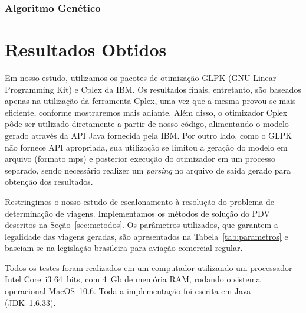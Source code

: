 \documentclass[12pt,a4paper]{article}
\newcommand{\zerar}{\setcounter{equation}{0}\setcounter{figure}{0}\setcounter{table}{0}}
\begin{document}

\subsubsection{Algoritmo Genético}
\label{sec:metodos_genetico}


\zerar
\section{Resultados Obtidos}
\label{sec:resultados}

Em nosso estudo, utilizamos os pacotes de otimização GLPK (GNU Linear Programming Kit) e Cplex da 
IBM. Os resultados finais, entretanto, são baseados apenas na utilização da ferramenta Cplex, uma 
vez que a mesma provou-se mais eficiente, conforme mostraremos mais adiante. Além disso, o 
otimizador Cplex pôde ser utilizado diretamente a partir de nosso código, alimentando o modelo 
gerado através da API Java fornecida pela IBM. Por outro lado, como o GLPK não fornece API 
apropriada, sua utilização se limitou a geração do modelo em arquivo (formato mps) e posterior 
execução do otimizador em um processo separado, sendo necessário realizer um {\it parsing} no 
arquivo de saída gerado para obtenção dos resultados.

Restringimos o nosso estudo de escalonamento à resolução do problema de determinação de viagens.
Implementamos os métodos de solução do PDV descritos na Seção~\ref{sec:metodos}. Os parâmetros 
utilizados, que garantem a legalidade das viagens geradas, são apresentados na 
Tabela~\ref{tab:parametros} e baseiam-se na legislação brasileira para aviação comercial regular. 

Todos os testes foram realizados em um computador utilizando um processador Intel Core~i3 64~bits, 
com 4~Gb de memória RAM, rodando o sistema operacional MacOS~10.6. Toda a implementação foi escrita 
em Java (JDK~1.6.33).
\end{document}

